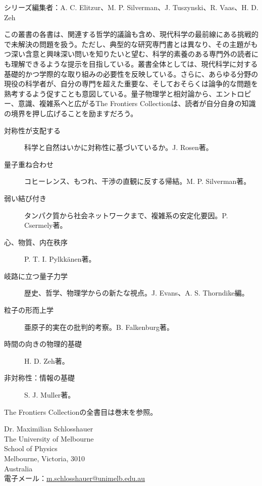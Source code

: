 シリーズ編集者：A. C. Elitzur、M. P. Silverman、J. Tuszynski、R. Vaas、H. D. Zeh

この叢書の各書は、関連する哲学的議論も含め、現代科学の最前線にある挑戦的で未解決の問題を扱う。ただし、典型的な研究専門書とは異なり、その主題がもつ深い含意と興味深い問いを知りたいと望む、科学的素養のある専門外の読者にも理解できるような提示を目指している。叢書全体としては、現代科学に対する基礎的かつ学際的な取り組みの必要性を反映している。さらに、あらゆる分野の現役の科学者が、自分の専門を超えた重要な、そしておそらくは論争的な問題を熟考するよう促すことも意図している。量子物理学と相対論から、エントロピー、意識、複雑系へと広がるThe Frontiers Collectionは、読者が自分自身の知識の境界を押し広げることを励ますだろう。

\begin{description}
\item[対称性が支配する] 科学と自然はいかに対称性に基づいているか。J. Rosen著。
\item[量子重ね合わせ] コヒーレンス、もつれ、干渉の直観に反する帰結。M. P. Silverman著。
\item[弱い結び付き] タンパク質から社会ネットワークまで、複雑系の安定化要因。P. Csermely著。
\item[心、物質、内在秩序] P. T. I. Pylkkänen著。
\item[岐路に立つ量子力学] 歴史、哲学、物理学からの新たな視点。J. Evans、A. S. Thorndike編。
\item[粒子の形而上学] 亜原子的実在の批判的考察。B. Falkenburg著。
\item[時間の向きの物理的基礎] H. D. Zeh著。
\item[非対称性：情報の基礎] S. J. Muller著。
\end{description}
The Frontiers Collectionの全書目は巻末を参照。

\clearpage
\begingroup\small
\noindent Dr. Maximilian Schlosshauer\\
The University of Melbourne\\School of Physics\\Melbourne, Victoria, 3010\\Australia\\
電子メール：\href{mailto:m.schlosshauer@unimelb.edu.au}{m.schlosshauer@unimelb.edu.au}


